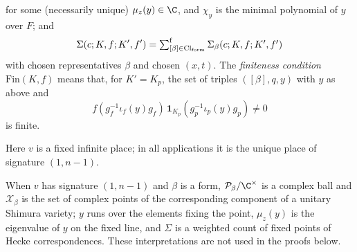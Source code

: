 \begin{definition}
\begin{enumerate}
  for some (necessarily unique) $\mu_z(y)\in\C$, and $\chi_y$ is the minimal polynomial of $y$ over $F$; and
  \[\Sigma(c;K,f;K',f')=\textstyle\sum\nolimits^{\mathrm f}_{[\beta]\in\mathrm{Cl}_{\mathrm{form}}}\Sigma_\beta(c;K,f;K',f')\]
  with chosen representatives $\beta$ and chosen $(x,t)$. The \emph{finiteness condition} $\mathrm{Fin}(K,f)$ means that, for $K'=K_p$, the set of triples
  $([\beta],q,y)$ with $y$ as above and
  \[f(g_f^{-1}\iota_f(y)g_f)\,\mathbf 1_{K_p}(g_p^{-1}\iota_p(y)g_p)\neq0\]
  is finite.
\end{enumerate}
Here $v$ is a fixed infinite place; in all applications it is the unique place of signature $(1,n-1)$.
\end{definition}

When $v$ has signature $(1,n-1)$ and $\beta$ is a form, $\mathcal P_\beta/\C^\times$ is a complex ball and
$\mathcal X_\beta$ is the set of complex points of the corresponding component of a unitary Shimura variety; $y$ runs
over the elements fixing the point, $\mu_z(y)$ is the eigenvalue of $y$ on the fixed line, and $\Sigma$ is a weighted
count of fixed points of Hecke correspondences. These interpretations are not used in the proofs below.

